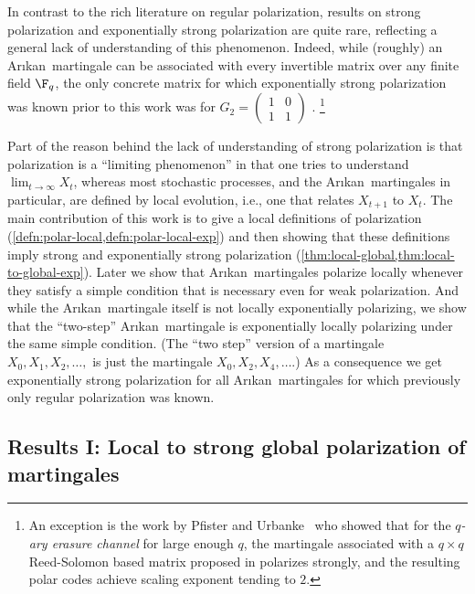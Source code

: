\documentclass[11pt]{article}
\newcommand{\Arikan}{Ar\i kan}
\begin{document}
In contrast to the rich literature on regular polarization, results on strong polarization and exponentially strong polarization are quite rare, reflecting a general lack of understanding of this phenomenon. Indeed, while (roughly) an \Arikan\ martingale can be associated with every invertible matrix over any finite field $\F_q$, the only concrete matrix for which exponentially strong polarization was known prior to this work was for  $G_2 = \left( \begin{smallmatrix}
	1 & 0  \\
	1 & 1
\end{smallmatrix} \right)$ \cite{GX15,HAU14,GV15}.
\footnote{An exception is the work by Pfister and Urbanke~\cite{PfisterU19} who showed that for the \emph{$q$-ary erasure channel} for large enough $q$, the martingale associated with a $q \times q$ Reed-Solomon based matrix proposed in \cite{mori-tanaka} polarizes strongly, and the resulting polar codes achieve scaling exponent tending to $2$.}



Part of the reason behind the lack of understanding of strong polarization is that polarization is a ``limiting phenomenon'' in that one tries to understand $\lim_{t\to\infty} X_t$, whereas most stochastic processes, and the \Arikan\ martingales in particular, are defined by local evolution, i.e., one that relates $X_{t+1}$ to $X_t$. The main contribution of this work is to give a local definitions of polarization (\cref{defn:polar-local,defn:polar-local-exp}) and then showing that these definitions imply strong and exponentially strong polarization (\cref{thm:local-global,thm:local-to-global-exp}). Later we show that \Arikan\ martingales polarize locally whenever they satisfy a simple condition that is necessary even for weak polarization. And while the \Arikan\ martingale itself is not locally exponentially polarizing, we show that the ``two-step'' \Arikan\ martingale is exponentially locally polarizing under the same simple condition. (The ``two step'' version of a martingale $X_0,X_1,X_2,\ldots,$ is just the martingale $X_0,X_2,X_4,\ldots$.) As a consequence we get exponentially strong polarization for all \Arikan\ martingales for which previously only regular polarization was known.



\subsection{Results I: Local to strong global polarization of martingales}
\end{document}
